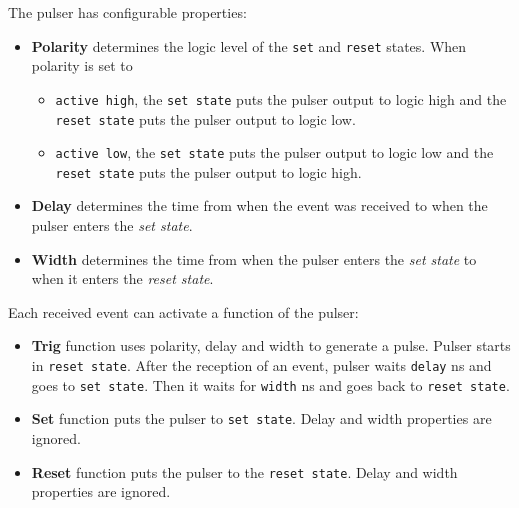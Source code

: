 \documentclass[12pt,a4paper]{article}
\begin{document}
The pulser has configurable properties:
\begin{itemize}
	\item \textbf{Polarity} determines the logic level of the \texttt{set} and \texttt{reset} states. When polarity is set to
	\begin{itemize}
		\item \texttt{active high}, the \texttt{set state} puts the pulser output to logic high and the \texttt{reset state} puts the pulser output to logic low. 
		\item \texttt{active low}, the \texttt{set state} puts the pulser output to logic low and the \texttt{reset state} puts the pulser output to logic high.
	\end{itemize}
	\item  \textbf{Delay} determines the time from when the event was received to when the pulser enters the \textit{set state}.
	\item  \textbf{Width} determines the time from when the pulser enters the \textit{set state} to when it enters the \textit{reset state}.
\end{itemize}

Each received event can activate a function of the pulser:
\begin{itemize}
	\item \textbf{Trig} function uses polarity, delay and width to generate a pulse. Pulser starts in \texttt{reset state}. After the reception of an event, pulser waits \texttt{delay} ns and goes to \texttt{set state}. Then it waits for \texttt{width} ns and goes back to \texttt{reset state}.
	\item \textbf{Set} function puts the pulser to \texttt{set state}. Delay and width properties are ignored.
	\item \textbf{Reset} function puts the pulser to the \texttt{reset state}. Delay and width properties are ignored.
\end{itemize}
\end{document}
